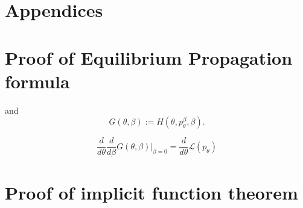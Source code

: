 \documentclass[a4paper,10pt]{report}
\begin{document}
\nocite{*}




\section{Appendices}
\appendix
\section{Proof of Equilibrium Propagation formula}
and
\begin{equation}
 G(\theta, \beta) := H(\theta, p_\theta^\beta, \beta).
\end{equation}

\begin{equation}
 \frac{d}{d\theta}\frac{d}{d\beta}G(\theta,\beta)\big|_{\beta=0} = \frac{d}{d\theta} \mathcal{L}(p_\theta)
\end{equation}
\appendix
\section{Proof of implicit function theorem}
\end{document}
